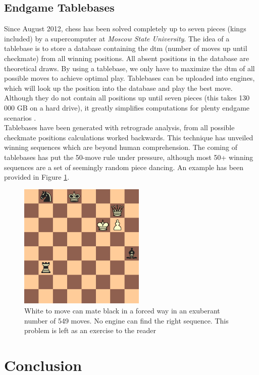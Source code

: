 \subsection{Endgame Tablebases}
\label{subsec:tablebases}
Since August 2012, chess has been solved completely up to seven pieces (kings included) by a supercomputer at \textit{Moscow State University}. The idea of a tablebase is to store a database containing the \gls{dtm} (number of moves up until checkmate) from all winning positions. All absent positions in the database are theoretical draws. By using a tablebase, we only have to maximize the \gls{dtm} of all possible moves to achieve optimal play. Tablebases can be uploaded into engines, which will look up the position into the database and play the best move. Although they do not contain all positions up until seven pieces (this takes 130 000 GB on a hard drive), it greatly simplifies computations for plenty endgame scenarios \cite{lomonosov12}.\\

Tablebases have been generated with retrograde analysis, from all possible checkmate positions calculations worked backwards. This technique has unveiled winning sequences which are beyond human comprehension. The coming of tablebases has put the 50-move rule under pressure, although most 50+ winning sequences are a set of seemingly random piece dancing. An example has been provided in Figure \ref{fig:mate549}. \\

\begin{figure}
\centering
\includegraphics[width=6cm]{fig/mate_in_549}
\caption[Mate in 549]{White to move can mate black in a forced way in an exuberant number of 549 moves. No engine can find the right sequence. This problem is left as an exercise to the reader}
\label{fig:mate549}
\end{figure}

\section{Conclusion}
\label{sec:chessconclusion}

